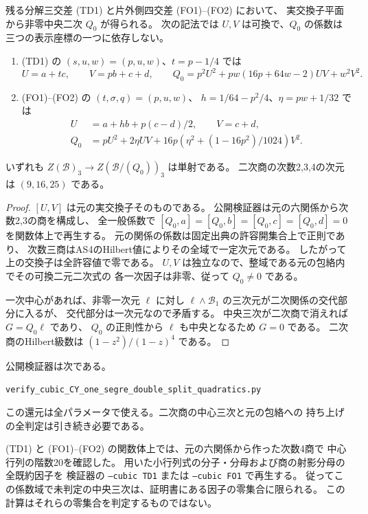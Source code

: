 \begin{proposition}\label{prop:cubic-CY-one-segre-double-split-quadratic-reduction}
残る分解三交差 (TD1) と片外側四交差 (FO1)--(FO2) において、
実交換子平面から非零中央二次 $Q_0$ が得られる。
次の記法では $U,V$ は可換で、$Q_0$ の係数は三つの表示座標の一つに依存しない。
\begin{enumerate}
\item (TD1) の $(s,u,w)=(p,u,w)$、$t=p-1/4$ では
\[
 U=a+tc,\qquad V=pb+c+d,\qquad
 Q_0=p^2U^2+pw(16p+64w-2)UV+w^2V^2.
\]
\item (FO1)--(FO2) の $(t,\sigma,q)=(p,u,w)$、
$h=1/64-p^2/4$、$\eta=pw+1/32$ では
\begin{align*}
 U&=a+hb+p(c-d)/2,\qquad V=c+d,\\
 Q_0&=pU^2+2\eta UV+16p\left(\eta^2+(1-16p^2)/1024\right)V^2.
\end{align*}
\end{enumerate}
いずれも $Z(\mathcal B)_3\to Z(\mathcal B/(Q_0))_3$ は単射である。
二次商の次数2,3,4の次元は $(9,16,25)$ である。
\end{proposition}
\begin{proof}
$[U,V]$ は元の実交換子そのものである。
公開検証器は元の六関係から次数2,3の商を構成し、
全一般係数で $[Q_0,a]=[Q_0,b]=[Q_0,c]=[Q_0,d]=0$
を関数体上で再生する。
元の関係の係数は固定出典の許容開集合上で正則であり、
次数三商はAS4のHilbert値によりその全域で一定次元である。
したがって上の交換子は全許容値で零である。
$U,V$ は独立なので、整域である元の包絡内でその可換二元二次式の
各一次因子は非零、従って $Q_0\ne0$ である。

一次中心があれば、非零一次元 $\ell$ に対し
$\ell\wedge \mathcal B_1$ の三次元が二次関係の交代部分に入るが、
交代部分は一次元なので矛盾する。
中央三次が二次商で消えれば $G=Q_0\ell$ であり、
$Q_0$ の正則性から $\ell$ も中央となるため $G=0$ である。
二次商のHilbert級数は $(1-z^2)/(1-z)^4$ である。
\end{proof}

公開検証器は次である。
\par\noindent\texttt{verify\_cubic\_CY\_one\_segre\_double\_split\_quadratics.py}
\par
この還元は全パラメータで使える。二次商の中心三次と元の包絡への
持ち上げの全判定は引き続き必要である。

(TD1) と (FO1)--(FO2) の関数体上では、元の六関係から作った次数4商で
中心行列の階数20を確認した。
用いた小行列式の分子・分母および商の射影分母の全既約因子を
検証器の \texttt{--cubic TD1} または \texttt{--cubic FO1} で再生する。
従ってこの係数域で未判定の中央三次は、証明書にある因子の零集合に限られる。
この計算はそれらの零集合を判定するものではない。

